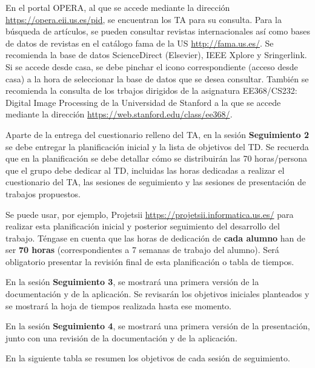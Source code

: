 \documentclass[a4paper]{article}
\begin{document}
En el portal OPERA, al que se accede mediante la dirección \url{https://opera.eii.us.es/pid}, se encuentran los TA para su consulta. Para la búsqueda de artículos, se pueden consultar revistas internacionales así como bases de datos de revistas en el catálogo fama de la US \url{http://fama.us.es/}. Se recomienda la base de datos ScienceDirect (Elsevier), IEEE Xplore y Sringerlink. Si se accede desde casa, se debe pinchar el icono correspondiente (acceso desde casa) a la hora de seleccionar la base de datos que se desea consultar. También se recomienda la consulta de los trbajos dirigidos de la asignatura EE368/CS232: Digital Image Processing de la Universidad de Stanford a la que se accede mediante la dirección \url{https://web.stanford.edu/class/ee368/}.


Aparte de la entrega del cuestionario relleno del TA, en la sesión \textbf{Seguimiento 2} se debe entregar la planificación inicial y la lista de objetivos del TD. Se recuerda que en la planificación se debe detallar cómo se distribuirán las 70 horas/persona que el grupo debe dedicar al TD, incluidas las horas dedicadas a realizar el cuestionario del TA, las sesiones de seguimiento y las sesiones de presentación de trabajos propuestos.  

Se puede usar, por ejemplo, Projetsii \url{https://projetsii.informatica.us.es/} para realizar esta planificación inicial y posterior seguimiento del desarrollo del trabajo. Téngase en cuenta que las horas de dedicación de \textbf{cada alumno} han de ser \textbf{70 horas} (correspondientes a 7 semanas de trabajo del alumno). Será obligatorio presentar la revisión final de esta planificación o tabla de tiempos.

En la sesión \textbf{Seguimiento 3}, se mostrará una primera versión de la documentación y de la aplicación. Se revisarán los objetivos iniciales planteados y se mostrará la hoja de tiempos realizada hasta ese momento.

En la sesión \textbf{Seguimiento 4}, se mostrará una primera versión de la presentación, junto con una revisión de la documentación y de la aplicación. 

En la siguiente tabla se resumen los objetivos de cada sesión de seguimiento. 
\end{document}
